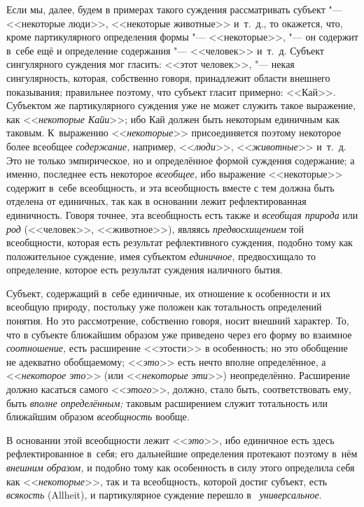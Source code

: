 Если мы, далее, будем в примерах такого суждения рассматривать субъект "---
<<некоторые люди>>, <<некоторые животные>> и~т.~д., то окажется, что, кроме
партикулярного определения формы "--- <<некоторые>>, "--- он содержит в~себе
ещё и определение содержания "--- <<человек>> и~т.~д. Субъект сингулярного
суждения мог гласить: <<этот человек>>, "--- некая сингулярность, которая,
собственно говоря, принадлежит области внешнего показывания; правильнее
поэтому, что субъект гласит примерно: <<Кай>>. Субъектом же партикулярного
суждения уже не может служить такое выражение, как <<{\em некоторые Кайи}>>;
ибо Кай должен быть некоторым единичным как таковым. К~выражению
<<{\em некоторые}>> присоединяется поэтому некоторое более всеобщее
{\em содержание,} например, <<{\em люди}>>, <<{\em животные}>> и~т.~д. Это
не только эмпирическое, но и определённое формой суждения содержание; а именно,
последнее есть некоторое {\em всеобщее,} ибо выражение <<некоторые>> содержит
в~себе всеобщность, и эта всеобщность вместе с тем должна быть отделена от
единичных, так как в основании лежит рефлектированная единичность. Говоря
точнее, эта всеобщность есть также и {\em всеобщая природа} или {\em род}
(<<человек>>, <<животное>>), являясь {\em предвосхищением} той всеобщности,
которая есть результат рефлективного суждения, подобно тому как положительное
суждение, имея субъектом {\em единичное,} предвосхищало то определение, которое
есть результат суждения наличного бытия.

Субъект, содержащий в~себе единичные, их отношение к особенности и их всеобщую
природу, постольку уже положен как тотальность определений понятия. Но это
рассмотрение, собственно говоря, носит внешний характер. То, что в субъекте
ближайшим образом уже приведено через его форму во взаимное {\em соотношение,}
есть расширение <<этости>> в особенность; но это обобщение не адекватно
обобщаемому; <<{\em это}>> есть нечто вполне определённое, а <<{\em некоторое
это}>> (или <<{\em некоторые эти}>>) неопределённо. Расширение должно касаться
самого <<{\em этого}>>, должно, стало быть, соответствовать ему, быть
{\em вполне определённым;} таковым расширением служит тотальность или
ближайшим образом {\em всеобщность} вообще.

В основании этой всеобщности лежит <<{\em это}>>, ибо единичное есть здесь
рефлектированное в~себя; его дальнейшие определения протекают поэтому в~нём
{\em внешним образом,} и подобно тому как особенность в силу этого определила
себя как <<{\em некоторые}>>, так и та всеобщность, которой достиг субъект,
есть {\em всякость} (Allheit), и партикулярное суждение перешло в~{\em
универсальное}.

